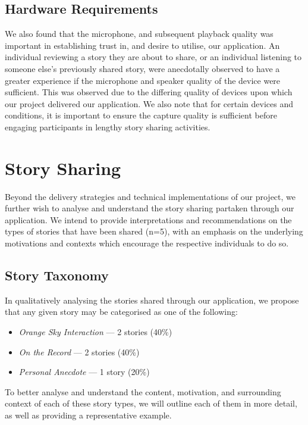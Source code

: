 \subsection{Hardware Requirements}

We also found that the microphone, and subsequent playback quality was important in establishing trust in, and desire to utilise, our application. An individual reviewing a story they are about to share, or an individual listening to someone else's previously shared story, were anecdotally observed to have a greater experience if the microphone and speaker quality of the device were sufficient. This was observed due to the differing quality of devices upon which our project delivered our application. We also note that for certain devices and conditions, it is important to ensure the capture quality is sufficient before engaging participants in lengthy story sharing activities.

\section{Story Sharing}

Beyond the delivery strategies and technical implementations of our project, we further wish to analyse and understand the story sharing partaken through our application. We intend to provide interpretations and recommendations on the types of stories that have been shared (n=5), with an emphasis on the underlying motivations and contexts which encourage the respective individuals to do so.

\subsection{Story Taxonomy}

In qualitatively analysing the stories shared through our application, we propose that any given story may be categorised as one of the following:

\begin{itemize}
    \item \emph{Orange Sky Interaction} --- 2 stories (40\%)
    \item \emph{On the Record} --- 2 stories (40\%)
    \item \emph{Personal Anecdote} --- 1 story (20\%)
\end{itemize}

To better analyse and understand the content, motivation, and surrounding context of each of these story types, we will outline each of them in more detail, as well as providing a representative example.

